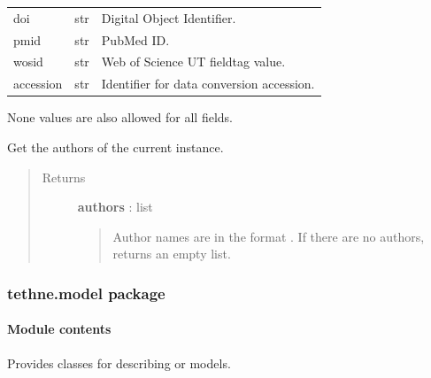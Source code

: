 \documentclass[letterpaper,10pt,english]{sphinxmanual}
\begin{document}
\begin{fulllineitems}
\begin{tabulary}{\linewidth}{|L|L|L|}
doi
 & 
str
 & 
Digital Object Identifier.
\\

pmid
 & 
str
 & 
PubMed ID.
\\

wosid
 & 
str
 & 
Web of Science UT fieldtag value.
\\

accession
 & 
str
 & 
Identifier for data conversion accession.
\\
\hline\end{tabulary}


None values are also allowed for all fields.

\begin{fulllineitems}
\label{tethne.classes.paper:tethne.classes.paper.Paper.authors}
Get the authors of the current {\hyperref[tethne.classes.paper:tethne.classes.paper.Paper]{}} instance.
\begin{quote}\begin{description}
\item[{Returns}] \leavevmode
\textbf{authors} : list
\begin{quote}

Author names are in the format . If there are no authors,
returns an empty list.
\end{quote}

\end{description}\end{quote}

\end{fulllineitems}


\end{fulllineitems}



\subsubsection{tethne.model package}
\label{tethne.model::doc}\label{tethne.model:tethne-model-package}

\paragraph{Module contents}
\label{tethne.model:module-tethne.model}\label{tethne.model:module-contents}
Provides classes for describing {\hyperref[tethne.model.corpus:module-tethne.model.corpus]{}} or {\hyperref[tethne.model.social:module-tethne.model.social]{}} models.
\end{document}
